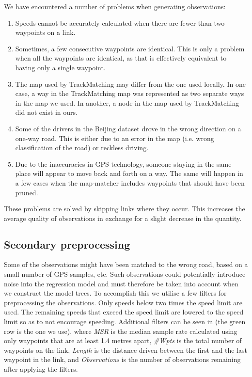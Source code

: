 We have encountered a number of problems when generating observations:

\begin{enumerate}
	\item Speeds cannot be accurately calculated when there are fewer than two waypoints on a link.
	\item Sometimes, a few consecutive waypoints are identical. This is only a problem when all the waypoints are identical, as that is effectively equivalent to having only a single waypoint.
	\item The map used by TrackMatching may differ from the one used locally. In one case, a way in the TrackMatching map was represented as two separate ways in the map we used. In another, a node in the map used by TrackMatching did not exist in ours.
	\item Some of the drivers in the Beijing dataset drove in the wrong direction on a one-way road. This is either due to an error in the map (i.e. wrong classification of the road) or reckless driving.
	\item Due to the inaccuracies in GPS technology, someone staying in the same place will appear to move back and forth on a way. The same will happen in a few cases when the map-matcher includes waypoints that should have been pruned.
\end{enumerate}

These problems are solved by skipping links where they occur. This increases the average quality of observations in exchange for a slight decrease in the quantity.

\subsection{Secondary preprocessing}
Some of the observations might have been matched to the wrong road, based on a small number of GPS samples, etc. Such observations could potentially introduce noise into the regression model and must therefore be taken into account when we construct the model trees. To accomplish this we utilise a few filters for preprocessing the observations. Only speeds below two times the speed limit are used. The remaining speeds that exceed the speed limit are lowered to the speed limit so as to not encourage speeding. Additional filters can be seen in  (the green row is the one we use), where \emph{MSR} is the median sample rate calculated using only waypoints that are at least 1.4 metres apart, \emph{\#Wpts} is the total number of waypoints on the link, \emph{Length} is the distance driven between the first and the last waypoint in the link, and \emph{Observations} is the number of observations remaining after applying the filters.

